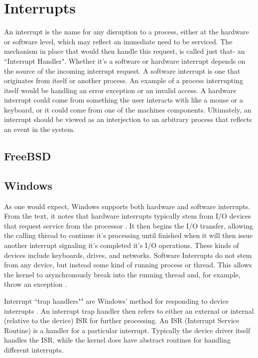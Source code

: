 \documentclass[10pt,draftclsnofoot,onecolumn]{IEEEtran}
\begin{document}
\section{Interrupts}
\label{sec:Interrupts}
\par An interrupt is the name for any disruption to a process, either at the hardware or software level, which may reflect an immediate need to be serviced.
The mechanism in place that would then handle this request, is called just that- an ``Interrupt Handler".
Whether it's a software or hardware interrupt depends on the source of the incoming interrupt request.
A software interrupt is one that originates from itself or another process.
An example of a process interrupting itself would be handling an error exception or an invalid access.
A hardware interrupt could come from something the user interacts with like a mouse or a keyboard, or it could come from one of the machines components.
Ultimately, an interrupt should be viewed as an interjection to an arbitrary process that reflects an event in the system.

\subsection{FreeBSD}
\label{sub:Interrupts FreeBSD}

\subsection{Windows}
\label{sub:Interrupts Windows}
\par As one would expect, Windows supports both hardware and software interrupts.
From the text, it notes that hardware interrupts typically stem from I/O devices that request service from the processor \cite{win:1}.
It then begins the I/O transfer, allowing the calling thread to continue it's processing until finished when it will then issue another interrupt signaling it's completed it's I/O operations.
These kinds of devices include keyboards, drives, and networks.
Software Interrupts do not stem from any device, but instead some kind of running process or thread.
This allows the kernel to asynchronously break into the running thread and, for example, throw an exception \cite{win:1}.

\par Interrupt ``trap handlers"" are Windows' method for responding to device interrupts \cite{win:1}.
An interrupt trap handler then refers to either an external or internal (relative to the device) ISR for further processing.
An ISR (Interrupt Service Routine) is a handler for a particular interrupt.
Typically the device driver itself handles the ISR, while the kernel does have abstract routines for handling different interrupts.
\end{document}
